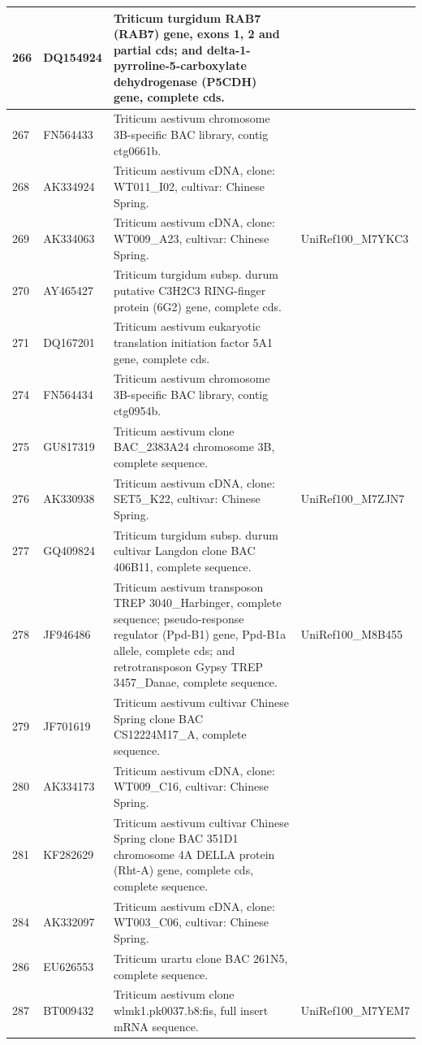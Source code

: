\documentclass[10.9pt]{article} %
\begin{document}
{\begin{longtable}{|p{1.5cm}|p{2cm}|p{9cm}|p{3cm}|}
\hline
266 & DQ154924 & Triticum turgidum RAB7 (RAB7) gene, exons 1, 2 and partial cds; and delta-1-pyrroline-5-carboxylate dehydrogenase (P5CDH) gene, complete cds. & \\
\hline
267 & FN564433 & Triticum aestivum chromosome 3B-specific BAC library, contig ctg0661b. & \\
\hline
268 & AK334924 & Triticum aestivum cDNA, clone: WT011\_I02, cultivar: Chinese Spring. & \\
\hline
269 & AK334063 & Triticum aestivum cDNA, clone: WT009\_A23, cultivar: Chinese Spring. & UniRef100\_M7YKC3\\
\hline
270 & AY465427 & Triticum turgidum subsp. durum putative C3H2C3 RING-finger protein (6G2) gene, complete cds. & \\
\hline
271 & DQ167201 & Triticum aestivum eukaryotic translation initiation factor 5A1 gene, complete cds. & \\
\hline
274 & FN564434 & Triticum aestivum chromosome 3B-specific BAC library, contig ctg0954b. & \\
\hline
275 & GU817319 & Triticum aestivum clone BAC\_2383A24 chromosome 3B, complete sequence. & \\
\hline
276 & AK330938 & Triticum aestivum cDNA, clone: SET5\_K22, cultivar: Chinese Spring. & UniRef100\_M7ZJN7\\
\hline
277 & GQ409824 & Triticum turgidum subsp. durum cultivar Langdon clone BAC 406B11, complete sequence. & \\
\hline
278 & JF946486 & Triticum aestivum transposon TREP 3040\_Harbinger, complete sequence; pseudo-response regulator (Ppd-B1) gene, Ppd-B1a allele, complete cds; and retrotransposon Gypsy TREP 3457\_Danae, complete sequence. & UniRef100\_M8B455\\
\hline
279 & JF701619 & Triticum aestivum cultivar Chinese Spring clone BAC CS12224M17\_A, complete sequence. & \\
\hline
280 & AK334173 & Triticum aestivum cDNA, clone: WT009\_C16, cultivar: Chinese Spring. & \\
\hline
281 & KF282629 & Triticum aestivum cultivar Chinese Spring clone BAC 351D1 chromosome 4A DELLA protein (Rht-A) gene, complete cds, complete sequence. & \\
\hline
284 & AK332097 & Triticum aestivum cDNA, clone: WT003\_C06, cultivar: Chinese Spring. & \\
\hline
286 & EU626553 & Triticum urartu clone BAC 261N5, complete sequence. & \\
\hline
287 & BT009432 & Triticum aestivum clone wlmk1.pk0037.b8:fis, full insert mRNA sequence. & UniRef100\_M7YEM7\\

\end{longtable}}
\end{document}
